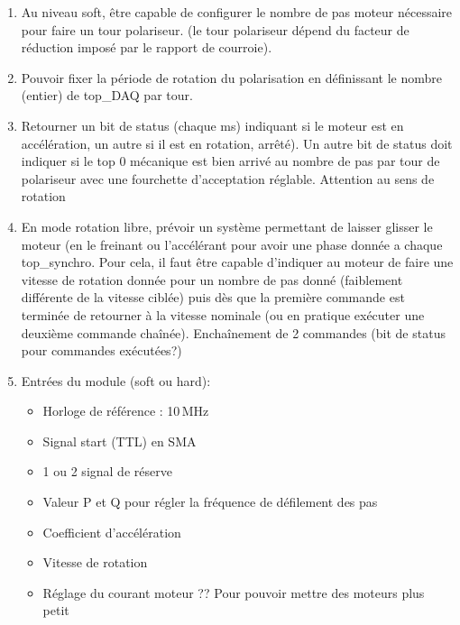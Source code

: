 \documentclass[11pt,a4paper,oneside,onecolumn]{article}
\begin{document}
\begin{enumerate}
\item Au niveau soft, être capable de configurer le nombre de pas moteur nécessaire pour faire un tour polariseur. (le tour polariseur dépend du facteur de réduction imposé par le rapport de courroie).
\item Pouvoir fixer la période de rotation du polarisation en définissant le nombre (entier) de top\_DAQ par tour.
\item Retourner un bit de status (chaque ms) indiquant si le moteur est en accélération, un autre si il est en rotation, arrêté). Un autre bit de status doit indiquer si le top 0 mécanique est bien arrivé au nombre de pas par tour de polariseur avec une fourchette d'acceptation réglable. Attention au sens de rotation
\item En mode rotation libre, prévoir un système permettant de laisser glisser le moteur (en le freinant ou l'accélérant pour avoir une phase donnée a chaque top\_synchro. 
Pour cela, il faut être capable d'indiquer au moteur de faire une vitesse de rotation donnée pour un nombre de pas donné (faiblement différente de la vitesse ciblée) puis dès que la première commande est terminée de retourner à la vitesse nominale (ou en pratique exécuter une deuxième commande chaînée).
Enchaînement de 2 commandes (bit de status pour commandes exécutées?)
\item Entrées du module (soft ou hard):
  \begin{itemize}
  \item Horloge de référence : 10\,MHz
  \item Signal start (TTL) en SMA
  \item 1 ou 2 signal de réserve
  \item Valeur P et Q pour régler la fréquence de défilement des pas
  \item Coefficient d'accélération
  \item Vitesse de rotation
  \item Réglage du courant moteur ?? Pour pouvoir mettre des moteurs plus petit
  \end {itemize}
  

\end{enumerate}
\end{document}

